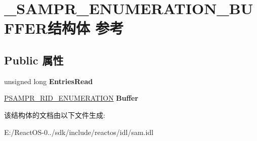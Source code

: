\hypertarget{struct___s_a_m_p_r___e_n_u_m_e_r_a_t_i_o_n___b_u_f_f_e_r}{}\section{\+\_\+\+S\+A\+M\+P\+R\+\_\+\+E\+N\+U\+M\+E\+R\+A\+T\+I\+O\+N\+\_\+\+B\+U\+F\+F\+E\+R结构体 参考}
\label{struct___s_a_m_p_r___e_n_u_m_e_r_a_t_i_o_n___b_u_f_f_e_r}
\subsection*{Public 属性}
\begin{DoxyCompactItemize}
\item 
\mbox{\label{struct___s_a_m_p_r___e_n_u_m_e_r_a_t_i_o_n___b_u_f_f_e_r_ace308a913d9fa4c59df082fc7abfddbe}} 
unsigned long {\bfseries Entries\+Read}
\item 
\mbox{\label{struct___s_a_m_p_r___e_n_u_m_e_r_a_t_i_o_n___b_u_f_f_e_r_a3265d0889e47393b1924c082cb2506ba}} 
\hyperlink{struct___s_a_m_p_r___r_i_d___e_n_u_m_e_r_a_t_i_o_n}{P\+S\+A\+M\+P\+R\+\_\+\+R\+I\+D\+\_\+\+E\+N\+U\+M\+E\+R\+A\+T\+I\+ON} {\bfseries Buffer}
\end{DoxyCompactItemize}


该结构体的文档由以下文件生成\+:\begin{DoxyCompactItemize}
\item 
E\+:/\+React\+O\+S-\/0../sdk/include/reactos/idl/sam.\+idl\end{DoxyCompactItemize}
